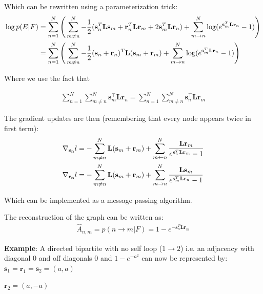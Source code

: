 \documentclass{article}
\begin{document}
Which can be rewritten using a parameterization trick:
\begin{align}
    \log p(E|F) &= \sum_{n=1}^{N} \Bigg(
        \sum_{m\not=n}^{N} -\frac{1}{2}(\mathbf{s}_n^T \mathbf{L} \mathbf{s}_m + \mathbf{r}_n^T \mathbf{L} \mathbf{r}_m + 2 \mathbf{s}_m^T \mathbf{L} \mathbf{r}_n) +
        \sum_{m \rightarrow n}^{N} \log(e^{\mathbf{s}_m^T \mathbf{L} \mathbf{r}_n} - 1) 
    \Bigg) \notag\\
    &= \sum_{n=1}^{N} \Bigg(
        \sum_{m\not=n}^{N} -\frac{1}{2}(\mathbf{s}_n + \mathbf{r}_n)^T \mathbf{L} (\mathbf{s}_m + \mathbf{r}_m) +
        \sum_{m \rightarrow n}^{N} \log(e^{\mathbf{s}_m^T \mathbf{L} \mathbf{r}_n} - 1) 
    \Bigg)
\end{align}

Where we use the fact that

\begin{align}
\sum_{n=1}^N  \sum_{m\not=n}^{N} \mathbf{s}_m^\top \mathbf{L}\mathbf{r}_n =
\sum_{n=1}^N  \sum_{m\not=n}^{N} \mathbf{s}_n^\top \mathbf{L}\mathbf{r}_m
\end{align}

The gradient updates are then (remembering that every node appears twice in first term):
\begin{align}
    \nabla_{\mathbf{s_n}}l &= -\sum_{m\not=n}^{N} \mathbf{L} (\mathbf{s}_m + \mathbf{r}_m) +
    \sum_{m \leftarrow n}^{N} \frac{\mathbf{L} \mathbf{r}_m}{e^{\mathbf{s}_n^T \mathbf{L} \mathbf{r}_m} - 1} \notag \\
    \nabla_{\mathbf{r_n}}l &= -\sum_{m\not=n}^{N} \mathbf{L} (\mathbf{s}_m + \mathbf{r}_m) +
    \sum_{m \rightarrow n}^{N} \frac{\mathbf{L} \mathbf{s}_m}{e^{\mathbf{s}_m^T \mathbf{L} \mathbf{r}_n} - 1}
\end{align}


Which can be implemented as a message passing algorithm. 

The reconstruction of the graph can be written as:
\begin{align}
    \hat{A}_{n,m} = p(n\rightarrow m|F) = 1 - e^{-\mathbf{s}_n^T \mathbf{L} \mathbf{r}_m}
\end{align}

\textbf{Example}: A directed bipartite with no self loop ($1\rightarrow 2$) i.e. an adjacency with diagonal 0 and off diagonals $0$ and $1-e^{-a^2}$ can now be represented by:
$\mathbf{s}_1 = \mathbf{r}_1 = \mathbf{s}_2 = (a,a)$

$\mathbf{r}_2 = (a, -a)$

\newpage
\end{document}
